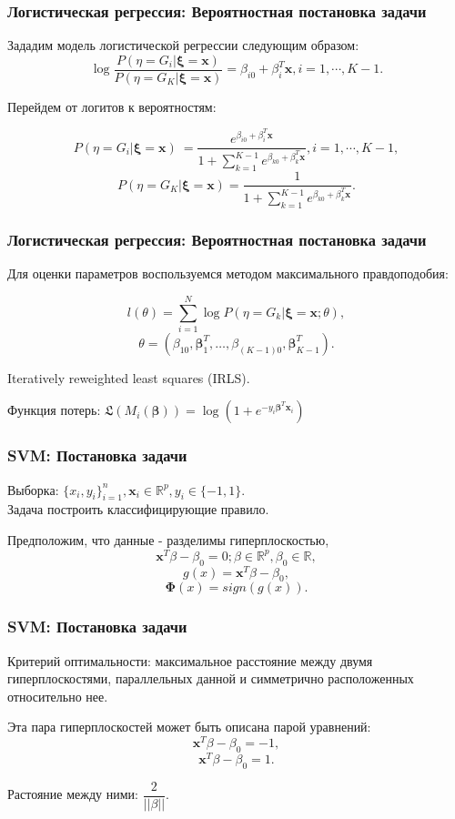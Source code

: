 \documentclass[11pt]{beamer}
\begin{document}
	\begin{frame}
		\frametitle{Логистическая регрессия: Вероятностная постановка задачи}
		Зададим модель логистической регрессии следующим образом:
		$$\log \dfrac{P(\eta = G_i | \bm{\xi} = \bm{x})}{P(\eta = G_K | \bm{\xi} = \bm{x})} = \beta_{i0} + \beta_{i}^T \bm{x}, i = 1, \cdots, K-1.$$
		
		Перейдем от логитов к вероятностям:
		
		$$P(\eta = G_i | \bm{\xi} = \bm{x})\ = \dfrac{e^{\beta_{i0} + \beta_{i}^T \bm{x}} }{1 + \sum_{k = 1}^{K-1} e^{\beta_{k0} + \beta_{k}^T \bm{x}}} , i = 1, \cdots, K-1 ,$$
		$$P(\eta = G_K | \bm{\xi} = \bm{x}) = \dfrac{1}{1 + \sum_{k = 1}^{K-1} e^{\beta_{k0} + \beta_{k}^T \bm{x}}}.$$
	\end{frame}

	\begin{frame}
		\frametitle{Логистическая регрессия: Вероятностная постановка задачи}
		Для оценки параметров воспользуемся методом максимального правдоподобия:
		
		$$ l(\theta) = \sum\limits_{i=1}^{N} \log P(\eta = G_k | \bm{\xi} = \bm{x}; \theta ), $$
		$$ \theta = (\beta_{10}, \bm{\beta}^T_1, \dotsc, \beta_{(K-1)0}, \bm{\beta}^T_{K-1}). $$
		
		
		Iteratively reweighted least squares (IRLS).
		
		\bigskip 
		
		Функция потерь: $\mathfrak{L}(M_i(\bm{\beta})) = \log(1 + e^{-y_i \bm{\beta}^T \bm{x}_i})$
	\end{frame}

	\begin{frame}
		\frametitle{SVM: Постановка задачи}
	
		Выборка: $\{x_i, y_i\}_{i=1}^{n}, \bm{x}_i \in \mathbb{R}^{p}, y_i \in \{-1, 1\}$. \\
		Задача построить классифицирующие правило.\\
		
		\bigskip 
		
		Предположим, что данные - разделимы гиперплоскостью,
		$$ \bm{x}^T\beta - \beta_0 = 0; \beta \in  \mathbb{R}^{p}, \beta_0 \in \mathbb{R},$$
		$$ g(x) =  \bm{x}^T \beta - \beta_0, $$
		$$ \bm{\Phi}(x) =  sign ( g(x) ).$$
	
	\end{frame}

	\begin{frame}
		\frametitle{SVM: Постановка задачи}
		
		Критерий оптимальности: максимальное расстояние между двумя гиперплоскостями, параллельных данной и симметрично расположенных относительно нее.
		
		\bigskip 
		
		Эта пара гиперплоскостей может быть описана парой уравнений:
		$$ \bm{x}^T \beta - \beta_0 = -1, $$
		$$ \bm{x}^T \beta - \beta_0 = 1. $$
		
		\bigskip 
		
		Растояние между ними: $ \dfrac{2}{||\beta||}. $
	\end{frame}
\end{document}
